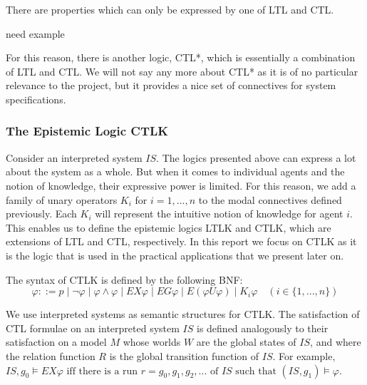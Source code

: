 \documentclass{article}
\newenvironment{definition}[1][Definition]{\begin{trivlist}
\item[\hskip \labelsep {\bfseries #1}]}{\end{trivlist}}
\newenvironment{example}[1][Example]{\begin{trivlist}
\item[\hskip \labelsep {\bfseries #1}]}{\end{trivlist}}
\begin{document}
There are properties which can only be expressed by one of LTL and CTL.
\begin{example}
need example
\end{example}
 For this reason, there is another logic, CTL*, which is essentially a combination of LTL and CTL. We will not say any more about CTL* as it is of no particular relevance to the project, but it provides a nice set of connectives for system specifications.

\subsubsection{The Epistemic Logic CTLK}

Consider an interpreted system $IS$. The logics presented above can express a lot about the system as a whole. But when it comes to individual agents and the notion of knowledge, their expressive power is limited. 
For this reason, we add a family of unary operators $K_i$ for $i = 1, ..., n$ to the modal connectives defined previously. Each $K_i$ will represent the intuitive notion of knowledge for agent $i$. 
This enables us to define the epistemic logics LTLK and CTLK, which are extensions of LTL and CTL, respectively. In this report we focus on CTLK as it is the logic that is used in the practical applications that we present later on.

\begin{definition} 
The syntax of CTLK is defined by the following BNF: 
$$ \varphi ::= p \mid \lnot \varphi \mid \varphi \land \varphi \mid EX\varphi \mid EG\varphi \mid E(\varphi U \varphi) \mid  K_i\varphi \quad (i \in \{1, ..., n\})$$
\end{definition}  

We use interpreted systems as semantic structures for CTLK. The satisfaction of CTL formulae on an interpreted system $IS$ is defined analogously to their satisfaction on a model $M$ whose worlds $W$ are the global states of $IS$, and where the relation function $R$ is the global transition function of $IS$. 
For example, $IS, g_0 \models EX\varphi \mbox{  iff there is a run } r = g_0, g_1, g_2, ... \mbox{ of $IS$ such that } (IS, g_1) \models \varphi$.
\end{document}
